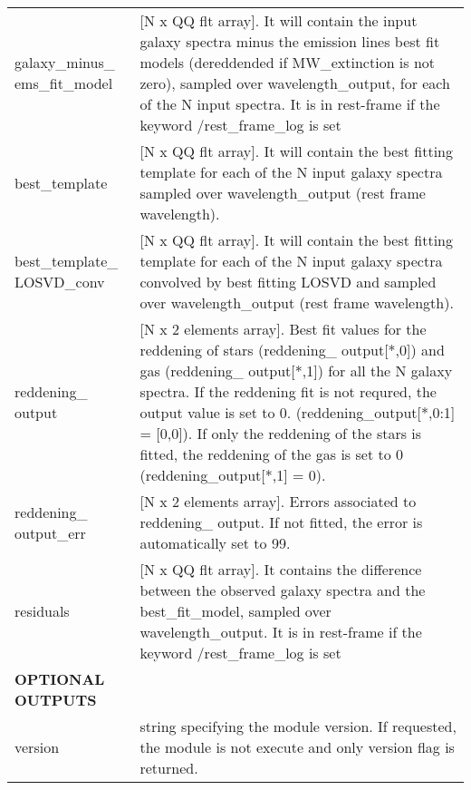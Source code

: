 \begin{center}
\begin{longtable}{p{2.7cm}| p{11.1cm}}
%
 galaxy\_minus\_ ems\_fit\_model &[N x QQ flt array]. It will contain the input galaxy spectra minus the emission lines best fit models (dereddended if MW\_extinction is not zero), 
                      sampled over wavelength\_output, for each of the N input spectra. It is in rest-frame if the keyword /rest\_frame\_log is set\\
%
 best\_template &[N x QQ flt array]. It will contain the best fitting template for each of the N input galaxy spectra sampled over wavelength\_output (rest frame wavelength). \\
%
 best\_template\_ LOSVD\_conv &[N x QQ flt array]. It will contain the best fitting template for each of the N input galaxy spectra convolved by best fitting 
LOSVD and sampled over wavelength\_output (rest frame wavelength).\\
%
reddening\_ output &[N x 2 elements array]. Best fit values for the reddening of stars (reddening\_ output[*,0]) and gas (reddening\_ output[*,1]) for all the N galaxy spectra. 
                                             If the reddening fit is not requred, the output value is set to 0. (reddening\_output[*,0:1] = [0,0]). 
                                             If only the reddening of the stars is fitted, the reddening of the gas is set to 0 (reddening\_output[*,1] = 0).\\
%
reddening\_ output\_err &[N x 2 elements array]. Errors associated to reddening\_ output. If not fitted, the error is automatically set to 99.\\
% 
 residuals &[N x QQ flt array]. It contains the difference between the observed galaxy spectra and the best\_fit\_model, 
                            sampled over wavelength\_output. It is in rest-frame if the keyword /rest\_frame\_log is set\\
%
\hline
{\bf  OPTIONAL OUTPUTS} &  \\
version & string specifying the module version. If requested, the module is not execute and only version flag is returned.\\
\hline
\hline
\end{longtable}
\end{center}
